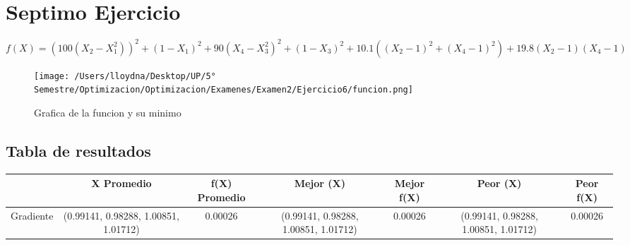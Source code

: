 \documentclass{report}
\begin{document}
        \section{Septimo Ejercicio}
            \begin{equation*}
                f(X)=(100(X_{2}-X_{1}^2))^2+(1-X_{1})^2+90(X_{4}-X_{3}^2)^2+(1-X_{3})^2+10.1((X_{2}-1)^2+(X_{4}-1)^2)+19.8(X_{2}-1)(X_{4}-1)
            \end{equation*}

            \begin{figure}[H]
                \texttt{[image: /Users/lloydna/Desktop/UP/5° Semestre/Optimizacion/Optimizacion/Examenes/Examen2/Ejercicio6/funcion.png]}
                \caption{Grafica de la funcion y su minimo}
                \label{fig:fun17}
            \end{figure}

            \subsection{Tabla de resultados}
                \begin{tabular}{l|c|c|c|c|c|c}
                    & X Promedio & f(X) Promedio & Mejor (X) & Mejor f(X) & Peor (X) & Peor f(X)\\
                    \hline
                    Gradiente & (0.99141, 0.98288, 1.00851, 1.01712) & 0.00026 & (0.99141, 0.98288, 1.00851, 1.01712) & 0.00026 & (0.99141, 0.98288, 1.00851, 1.01712) & 0.00026\\
                    \hline
                \end{tabular}
        \pagebreak
        
\end{document}
